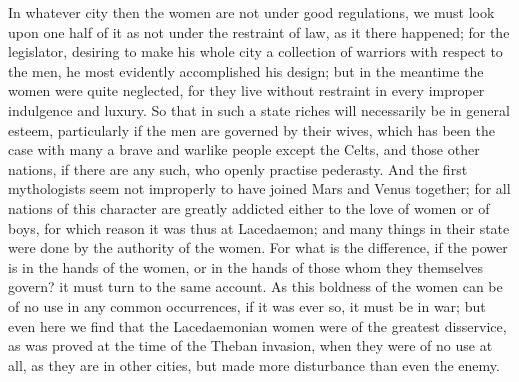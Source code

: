 In whatever city then the women are not under good regulations, we must
look upon one half of it as not under the restraint of law, as it there
happened; for the legislator, desiring to make his whole city a collection
of warriors with respect to the men, he most evidently accomplished his
design; but in the meantime the women were quite neglected, for they live
without restraint in every improper indulgence and luxury. So that in such
a state riches will necessarily be in general esteem, particularly if the
men are governed by their wives, which has been the case with many a brave
and warlike people except the Celts, and those other nations, if there are
any such, who openly practise pederasty. And the first mythologists seem
not improperly to have joined Mars and Venus together; for all nations of
this character are greatly addicted either to the love of women or of
boys, for which reason it was thus at Lacedaemon; and many things in their
state were done by the authority of the women. For what is the difference,
if the power is in the hands of the women, or in the hands of those whom
they themselves govern? it must turn to the same account. As this boldness
of the women can be of no use in any common occurrences, if it was ever
so, it must be in war; but even here we find that the Lacedaemonian women
were of the greatest disservice, as was proved at the time of the Theban
invasion, when they were of no use at all, as they are in other cities,
but made more disturbance than even the enemy.


